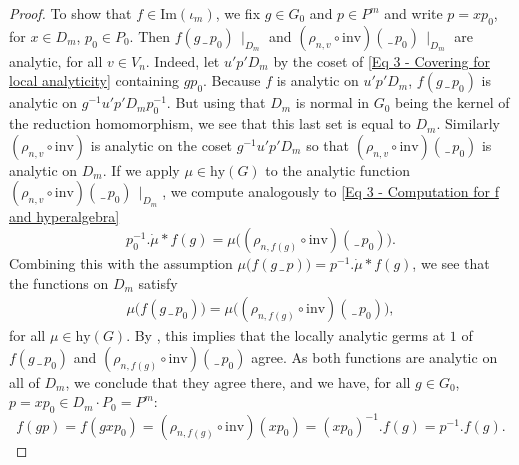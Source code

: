 \documentclass[a4paper, reqno, 10pt]{amsart}
\theoremstyle{definition}
\numberwithin{equation}{section}
\newcommand{\blank}{{\,\_\,}}
\newcommand{\hy}{{\mathrm{hy}}}
\renewcommand{\Im}{{\mathrm{Im}}}
\newcommand{\inv}{{\mathrm{inv}}}
\newcommand{\res}[1]{{\!\,\mid_{#1}}}
\begin{document}
\begin{proof}
	
	To show that $f \in \Im(\iota_m)$, we fix $g\in G_0$ and $p \in P^m$ and write $p=xp_0$, for $x \in D_m$, $p_0 \in P_0$.
	Then $f(g \blank p_0)\res{D_m}$ and $(\rho_{n,v}\circ \inv)(\blank p_0)\res{D_m}$ are analytic, for all $v\in V_n$.
	Indeed, let $u'p'D_m$ by the coset of \eqref{Eq 3 - Covering for local analyticity} containing $gp_0$.
	Because $f$ is analytic on $u'p'D_m$, $f(g \blank p_0)$ is analytic on $g^{-1} u'p'D_m p_0^{-1}$.
	But using that $D_m$ is normal in $G_0$ being the kernel of the reduction homomorphism, we see that this last set is equal to $D_m$.
	Similarly $(\rho_{n,v} \circ \inv)$ is analytic on the coset $g^{-1} u'p'D_m$ so that $(\rho_{n,v}\circ \inv)(\blank p_0)$ is analytic on $D_m$.
	If we apply $\mu \in \hy(G)$ to the analytic function $(\rho_{n,v}\circ \inv)(\blank p_0)\res{D_m}$, we compute analogously to \eqref{Eq 3 - Computation for f and hyperalgebra}
	\begin{equation*} 
		p_0^{-1}. \dot{\mu} \ast f(g) = \mu \big( (\rho_{n,f(g)}\circ \inv)(\blank p_0) \big) . 
	\end{equation*}
	Combining this with the assumption $\mu \big( f(g \blank p) \big) = p^{-1}.\dot{\mu} \ast f(g)$, we see that the functions on $D_m$ satisfy
	\begin{equation*}
		\begin{aligned}
			\mu \big( f(g\blank p_0) \big) = \mu \big( (\rho_{n,f(g)}\circ \inv)(\blank p_0) \big),
		\end{aligned}
	\end{equation*}
	for all $\mu \in \hy(G)$.
	By , this implies that the locally analytic germs at $1$ of $f(g\blank p_0)$ and $(\rho_{n,f(g)}\circ\inv)(\blank p_0)$ agree.
	As both functions are analytic on all of $D_m$, we conclude that they agree there, and we have, for all $g\in G_0$, $p=xp_0 \in D_m \cdot P_0 = P^m$:
	\begin{equation*}
		f(gp)= f(gxp_0) = (\rho_{n,f(g)} \circ \inv)(xp_0) = (xp_0)^{-1}.f(g) = p^{-1}.f(g) .
	\end{equation*}
\end{proof}
\end{document}
